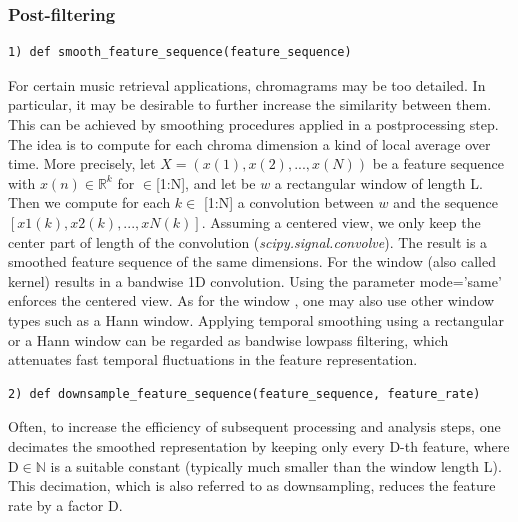 \documentclass[
	12pt, %
]{fphw}
\begin{document}
\subsubsection{Post-filtering}

\begin{lstlisting}
1) def smooth_feature_sequence(feature_sequence)
\end{lstlisting}
For certain music retrieval applications, chromagrams may be too detailed. In particular, it may be desirable to further increase the similarity between them. This can be achieved by smoothing procedures applied in a postprocessing step. The idea is to compute for each chroma dimension a kind of local average over time.
More precisely, let $X=(x(1),x(2),...,x(N))$ be a feature sequence with $x(n)\in \mathbb{R}^k$ for $\in$[1:N], and let be $w$ a rectangular window  of length L. Then we compute for each $k \in$ [1:N] a convolution between $w$ and the sequence $[x1(k),x2(k),...,xN(k)]$. Assuming a centered view, we only keep the center part of length of the convolution (\textit{scipy.signal.convolve}). The result is a smoothed feature sequence of the same dimensions.
For the window (also called kernel) results in a bandwise 1D convolution. Using the parameter mode='same' enforces the centered view. As for the window , one may also use other window types such as a Hann window.
Applying temporal smoothing using a rectangular or a Hann window can be regarded as bandwise lowpass filtering, which attenuates fast temporal fluctuations in the feature representation.

\begin{lstlisting}
2) def downsample_feature_sequence(feature_sequence, feature_rate)
\end{lstlisting}

Often, to increase the efficiency of subsequent processing and analysis steps, one decimates the smoothed representation by keeping only every D-th feature, where D$\in\mathbb{N}$ is a suitable constant (typically much smaller than the window length L). This decimation, which is also referred to as downsampling, reduces the feature rate by a factor D.
\end{document}
